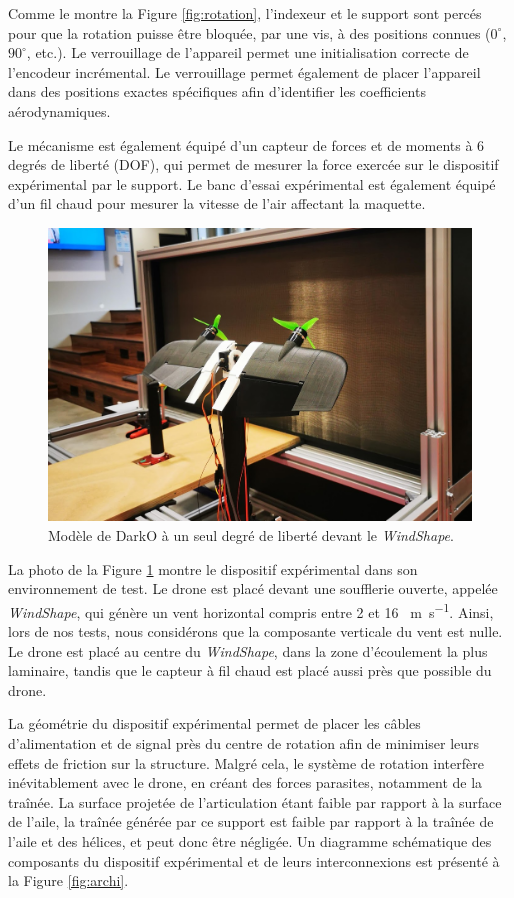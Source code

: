 Comme le montre la Figure \ref{fig:rotation}, l'indexeur et le support sont percés pour que la rotation puisse être bloquée, par une vis, à des positions connues ($0^\circ$, $90^\circ$, etc.). Le verrouillage de l'appareil permet une initialisation correcte de l'encodeur incrémental. Le verrouillage permet également de placer l'appareil dans des positions exactes spécifiques afin d'identifier les coefficients aérodynamiques. 

Le mécanisme est également équipé d'un capteur de forces et de moments à 6 degrés de liberté (DOF), qui permet de mesurer la force exercée sur le dispositif expérimental par le support. Le banc d'essai expérimental est également équipé d'un fil chaud pour mesurer la vitesse de l'air affectant la maquette. 

\begin{figure}[!ht]
    \centering
    \includegraphics[trim=0cm 5cm 0cm 6cm,clip,width=0.8\columnwidth]{figures/real_test_bench-min.jpg}
    \caption{Modèle de DarkO à un seul degré de liberté devant le \textit{WindShape}.}
    \label{fig:real_test_bench}
\end{figure}
La photo de la Figure \ref{fig:real_test_bench} montre le dispositif expérimental dans son environnement de test. Le drone est placé devant une soufflerie ouverte, appelée \textit{WindShape}, qui génère un vent horizontal compris entre 2 et 16 \SI{}{\meter\per\second}. Ainsi, lors de nos tests, nous considérons que la composante verticale du vent est nulle. Le drone est placé au centre du \textit{WindShape}, dans la zone d'écoulement la plus laminaire, tandis que le capteur à fil chaud est placé aussi près que possible du drone. 

La géométrie du dispositif expérimental permet de placer les câbles d'alimentation et de signal près du centre de rotation afin de minimiser leurs effets de friction sur la structure. Malgré cela, le système de rotation interfère inévitablement avec le drone, en créant des forces parasites, notamment de la traînée. La surface projetée de l'articulation étant faible par rapport à la surface de l'aile, la traînée générée par ce support est faible par rapport à la traînée de l'aile et des hélices, et peut donc être négligée. Un diagramme schématique des composants du dispositif expérimental et de leurs interconnexions est présenté à la Figure \ref{fig:archi}.

